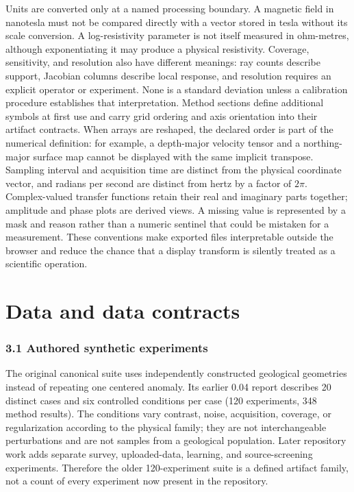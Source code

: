 Units are converted only at a named processing boundary. A magnetic
field in nanotesla must not be compared directly with a vector stored in
tesla without its scale conversion. A log-resistivity parameter is not
itself measured in ohm-metres, although exponentiating it may produce a
physical resistivity. Coverage, sensitivity, and resolution also have
different meanings: ray counts describe support, Jacobian columns
describe local response, and resolution requires an explicit operator
or experiment. None is a standard deviation unless a calibration
procedure establishes that interpretation. Method sections define
additional symbols at first use and carry grid ordering and axis
orientation into their artifact contracts.
When arrays are reshaped, the declared order is part of the numerical
definition: for example, a depth-major velocity tensor and a
northing-major surface map cannot be displayed with the same implicit
transpose. Sampling interval and acquisition time are distinct from
the physical coordinate vector, and radians per second are distinct
from hertz by a factor of $2\pi$. Complex-valued transfer functions
retain their real and imaginary parts together; amplitude and phase
plots are derived views. A missing value is represented by a mask and
reason rather than a numeric sentinel that could be mistaken for a
measurement. These conventions make exported files interpretable
outside the browser and reduce the chance that a display transform is
silently treated as a scientific operation.

\section{Data and data contracts}\label{data-and-experimental-scope}

\subsubsection{3.1 Authored synthetic
experiments}\label{authored-synthetic-experiments}

The original canonical suite uses independently constructed geological
geometries instead of repeating one centered anomaly. Its earlier 0.04
report describes 20 distinct cases and six controlled conditions per
case (120 experiments, 348 method results). The conditions vary
contrast, noise, acquisition, coverage, or regularization according to
the physical family; they are not interchangeable perturbations and are
not samples from a geological population. Later repository work adds
separate survey, uploaded-data, learning, and source-screening
experiments. Therefore the older 120-experiment suite is a defined
artifact family, not a count of every experiment now present in the
repository.

